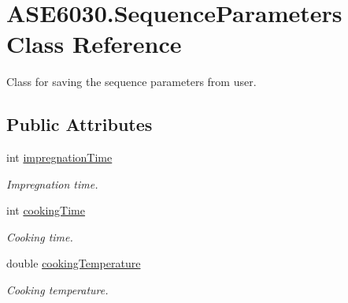 \hypertarget{class_a_s_e6030_1_1_sequence_parameters}{}\section{A\+S\+E6030.\+Sequence\+Parameters Class Reference}
\label{class_a_s_e6030_1_1_sequence_parameters}


Class for saving the sequence parameters from user.  


\subsection*{Public Attributes}
\begin{DoxyCompactItemize}
\item 
\mbox{\label{class_a_s_e6030_1_1_sequence_parameters_a9f894780c256e1d4ccba4d528689db2d}} 
int \hyperlink{class_a_s_e6030_1_1_sequence_parameters_a9f894780c256e1d4ccba4d528689db2d}{impregnation\+Time}
\begin{DoxyCompactList}\small\item\em Impregnation time. \end{DoxyCompactList}\item 
\mbox{\label{class_a_s_e6030_1_1_sequence_parameters_a849f7bfb15f35ea4ca038f4c4e5f147c}} 
int \hyperlink{class_a_s_e6030_1_1_sequence_parameters_a849f7bfb15f35ea4ca038f4c4e5f147c}{cooking\+Time}
\begin{DoxyCompactList}\small\item\em Cooking time. \end{DoxyCompactList}\item 
\mbox{\label{class_a_s_e6030_1_1_sequence_parameters_aa6ea81d58306fa849f0c15d1f4d2331c}} 
double \hyperlink{class_a_s_e6030_1_1_sequence_parameters_aa6ea81d58306fa849f0c15d1f4d2331c}{cooking\+Temperature}
\begin{DoxyCompactList}\small\item\em Cooking temperature. \end{DoxyCompactList}\item 
\mbox{\label{class_a_s_e6030_1_1_sequence_parameters_a3541c0320c22637b3566458078f2865d}} 

\end{DoxyCompactItemize}
